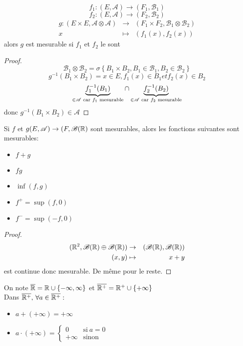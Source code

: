 \begin{prop}
	$$f_1 : (E,\mathscr{A}) \rightarrow (F_1,\mathscr{B}_1)$$
	$$f_2 : (E,\mathscr{A}) \rightarrow (F_2,\mathscr{B}_2)$$
	\begin{eqnarray*}
		g: (E \times E,\mathscr{A} \otimes \mathscr{A}) &\rightarrow& (F_1 \times F_2,\mathscr{B}_1 \otimes \mathscr{B}_2)\\
		x &\mapsto& (f_1(x), f_2(x))
	\end{eqnarray*}
	alors $g$ est mesurable si $f_1$ et $f_2$ le sont
\end{prop}

\begin{proof}
	$$\mathscr{B_1} \otimes \mathscr{B}_2 = \sigma \left\{ B_1 \times B_2, B_1 \in \mathscr{B}_1, B_2 \in \mathscr{B}_2 \right\}$$
	$$g^{-1}(B_1 \times B_2) = {x \in E, f_1(x) \in B_1 et f_2(x) \in B_2  }$$
	$$ \underbrace{f_1^{-1}(B_1)}_{\in \mathscr{A} \text{ car } f_1 \text{ mesurable}} \cap \underbrace{f_2^{-1}(B_2)}_{\in \mathscr{A} \text{ car } f_2 \text{ mesurable}}$$
	donc $g^{-1}(B_1 \times B_2) \in \mathscr{A}$
\end{proof}

\begin{prop}
	Si $f$ et $g (E,\mathscr{A}) \rightarrow (F,\mathscr{B}(\mathbb{R})$
	sont mesurables, alors les fonctions suivantes sont mesurables:
	\begin{itemize}
		\item $f + g$
		\item $fg$
		\item $\inf(f,g)$
		\item $f^+ = \sup(f,0)$
		\item $f^- = \sup(-f,0)$
	\end{itemize}
\end{prop}

\begin{proof}
	\begin{eqnarray*}
		(\mathbb{R}^2, \mathscr{B}(\mathbb{R}) \oplus \mathscr{B}(\mathbb{R}))   &\rightarrow& (\mathscr{B}(\mathbb{R}), \mathscr{B}(\mathbb{R})) \\
		(x,y) &\mapsto& x + y
	\end{eqnarray*}
	est continue donc mesurable. De même pour le reste.
\end{proof}


\begin{definition}
	On note $\overline{\mathbb{R}} = \mathbb{R} \cup \{ -\infty, \infty \}$ et $\overline{\mathbb{R}^+} = \mathbb{R}^+ \cup \{  +\infty \}$\\
	Dans $\overline{\mathbb{R}^+} , \, \forall a \in \overline{\mathbb{R}^+}: $
	\begin{itemize}
		\item $a + (+\infty) = +\infty$
		\item
		      $a \cdot (+\infty) = \left\{ \begin{array}{cc}
				      0       & \text{si} \  a = 0 \\
				      +\infty & \text{sinon}
			      \end{array}\right.$
	\end{itemize}
\end{definition}

